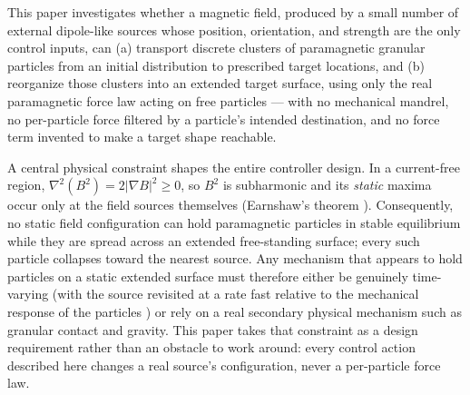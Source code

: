 \documentclass[journal]{IEEEtran}
\begin{document}
This paper investigates whether a magnetic field, produced by a small number
of external dipole-like sources whose position, orientation, and strength
are the only control inputs, can (a) transport discrete clusters of
paramagnetic granular particles from an initial distribution to prescribed
target locations, and (b) reorganize those clusters into an extended target
surface, using only the real paramagnetic force law acting on free
particles --- with no mechanical mandrel, no per-particle force filtered by
a particle's intended destination, and no force term invented to make a
target shape reachable.

A central physical constraint shapes the entire controller design. In a
current-free region, $\nabla^2(B^2) = 2|\nabla B|^2 \geq 0$, so $B^2$ is
subharmonic and its \emph{static} maxima occur only at the field sources
themselves (Earnshaw's theorem \cite{earnshaw_wiki}). Consequently, no
static field configuration can hold paramagnetic particles in stable
equilibrium while they are spread across an extended free-standing surface;
every such particle collapses toward the nearest source. Any mechanism that
appears to hold particles on a static extended surface must therefore
either be genuinely time-varying (with the source revisited at a rate fast
relative to the mechanical response of the particles
\cite{earnshaw_timeaveraging_patent}) or rely on a real secondary physical
mechanism such as granular contact and gravity. This paper takes that
constraint as a design requirement rather than an obstacle to work around:
every control action described here changes a real source's configuration,
never a per-particle force law.
\end{document}

